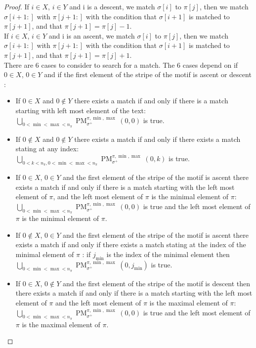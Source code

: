 \documentclass[a4paper]{llncs}
\newcommand{\ptext}{\pi}
\newcommand{\pmotif}{\sigma}
\newcommand{\x}{X}
\newcommand{\y}{Y}
\newcommand{\pbmotif}{\pmotif^+}
\DeclareMathOperator{\PMa}{PM}
\newcommand{\PM}[6]{\PMa_{{#1}}^{{#2},{#3},{#4}}({#5},{#6})}
\begin{document}
\begin{proof}
If $i \in \x$, $i \in \y$ and i is a descent,
we match $\pmotif[i]$ to $\ptext[j]$,
then we match $\pmotif[i+1:]$ with $\ptext[j+1:]$
with the condition that
$\pmotif[i+1]$ is matched to $\ptext[j+1]$,
and that $\ptext[j+1]=\ptext[j]-1$.\\

If $i \in \x$, $i \in \y$ and i is an ascent,
we match $\pmotif[i]$ to $\ptext[j]$,
then we match $\pmotif[i+1:]$ with $\ptext[j+1:]$
with the condition that
$\pmotif[i+1]$ is matched to $\ptext[j+1]$,
and that $\ptext[j+1]=\ptext[j]+1$.\\		
		
There are 6 cases to consider to search for a match. The 6 cases depend on if $0 \in \x$, $0 \in \y$ and if the first element of the stripe of the motif is ascent or descent :
\begin{itemize}
	\item If $0 \in \x$ and $0 \notin \y$ there exists a match if and only if there is a match starting with left most element of the text:\\ $\bigcup_{0<\min<\max<n_\ptext}
	\PM{\pbmotif}{\ptext}{\min}{\max}{0}{0}$ is true.
	
	\item If $0 \notin \x$ and $0 \notin \y$ there exists a match if and only if there exists a match stating at any index: \\	$\bigcup_{0<k<n_\ptext,0<\min<\max<n_\ptext}\PM{\pbmotif}{\ptext}{\min}{\max}{0}{k}$ is true.
	
	\item If $0 \in \x$, $0 \in \y$ and the first element of the stripe of the motif is ascent there exists a match if and only if there is a match starting with the left most element  of $\ptext$, and the left most element  of $\ptext$ is the minimal element  of $\ptext$:\\ $\bigcup_{0<\min<\max<n_\ptext}\PM{\pbmotif}{\ptext}{\min}{\max}{0}{0}$  is true and the left most element of $\ptext$ is the minimal element of $\ptext$.
	
	\item If $0 \notin \x$, $0 \in \y$ and the first element of the stripe of the motif is ascent there exists a match if and only if there exists a match stating at the index of the minimal element of $\ptext$ : if $j_{\min}$ is the index of the minimal element then \\	$\bigcup_{0<\min<\max<n_\ptext}\PM{\pbmotif}{\ptext}{\min}{\max}{0}{j_{\min}}$ is true.	
			
	\item If $0 \in \x$, $0 \notin \y$  and the first element of the stripe of the motif is descent then there exists a match if and only if there is a match starting with the left most element  of $\ptext$ and the left most element  of $\ptext$ is the maximal element  of $\ptext$:\\ $\bigcup_{0<\min<\max<n_\ptext}\PM{\pbmotif}{\ptext}{\min}{\max}{0}{0}$ is true and the left most element of $\ptext$ is the maximal element of $\ptext$.
	

\end{itemize}
\end{proof}
\end{document}
